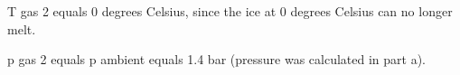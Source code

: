 T gas 2 equals 0 degrees Celsius, since the ice at 0 degrees Celsius can no longer melt.  

p gas 2 equals p ambient equals 1.4 bar (pressure was calculated in part a).